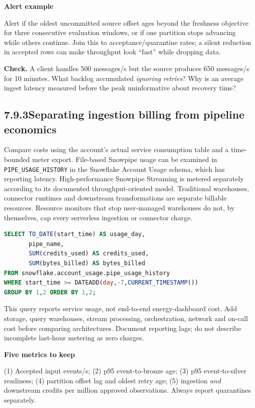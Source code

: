 \documentclass[11pt,twoside]{article}
\newcommand{\topic}[2]{\subsection*{#1\quad #2}}
\begin{document}
\begin{whitebox}\textbf{Alert example}\par
Alert if the oldest uncommitted source offset ages beyond the freshness objective for three consecutive evaluation windows, or if one partition stops advancing while others continue. Join this to acceptance/quarantine rates; a silent reduction in accepted rows can make throughput look ``fast'' while dropping data.\end{whitebox}
\textbf{Check.} A client handles 500 messages/s but the source produces 650 messages/s for 10 minutes. What backlog accumulated \emph{ignoring retries}? Why is an average ingest latency measured before the peak uninformative about recovery time?
\newpage
\topic{7.9.3}{Separating ingestion billing from pipeline economics}
Compare costs using the account's actual service consumption table and a time-bounded meter export. File-based Snowpipe usage can be examined in \texttt{PIPE\_USAGE\_HISTORY} in the Snowflake Account Usage schema, which has reporting latency. High-performance Snowpipe Streaming is metered separately according to its documented throughput-oriented model. Traditional warehouses, connector runtimes and downstream transformations are separate billable resources. Resource monitors that stop user-managed warehouses do not, by themselves, cap every serverless ingestion or connector charge.
\begin{lstlisting}[language=SQL,caption={Auditable file-based Snowpipe meter query; requires privileges.}]
SELECT TO_DATE(start_time) AS usage_day,
       pipe_name,
       SUM(credits_used) AS credits_used,
       SUM(bytes_billed) AS bytes_billed
FROM snowflake.account_usage.pipe_usage_history
WHERE start_time >= DATEADD(day,-7,CURRENT_TIMESTAMP())
GROUP BY 1,2 ORDER BY 1,2;
\end{lstlisting}
This query reports service usage, not end-to-end energy-dashboard cost. Add storage, query warehouses, stream processing, orchestration, network and on-call cost before comparing architectures. Document reporting lags; do not describe incomplete last-hour metering as zero charges.
\begin{whitebox}\textbf{Five metrics to keep}\par
(1) Accepted input events/s; (2) p95 event-to-bronze age; (3) p95 event-to-silver readiness; (4) partition offset lag and oldest retry age; (5) ingestion \emph{and} downstream credits per million approved observations. Always report quarantines separately.\end{whitebox}
\end{document}
